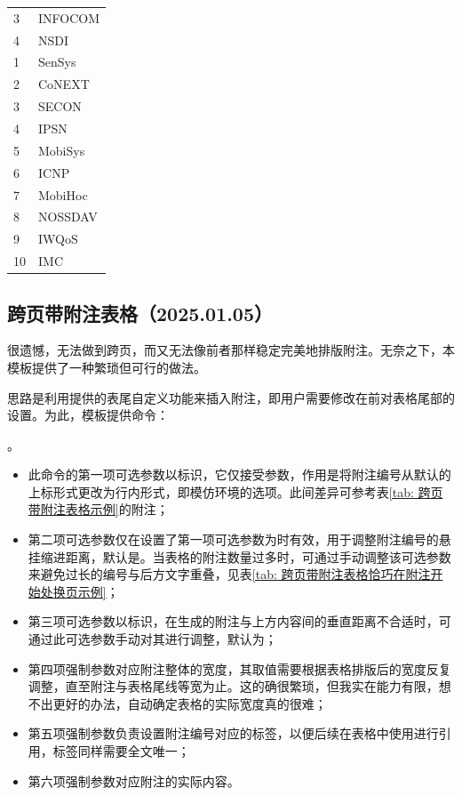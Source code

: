 \documentclass[doctor, vlined, ]{DissertUESTC}
\begin{document}
\begin{longtable}{p{2em} p{4.5em}}
		3 & INFOCOM \\
		4 & NSDI \\
		1 & SenSys \\
		2 & CoNEXT \\
		3 & SECON \\
		4 & IPSN \\
		5 & MobiSys \\
		6 & ICNP \\
		7 & MobiHoc \\
		8 & NOSSDAV \\
		9 & IWQoS \\
		10 & IMC \\
	\end{longtable}

	\clearpage
	\subsection{跨页带附注表格（2025.01.05）}

	很遗憾，无法做到跨页，而又无法像前者那样稳定完美地排版附注。无奈之下，本模板提供了一种繁琐但可行的做法。

	思路是利用提供的表尾自定义功能来插入附注，即用户需要修改在前对表格尾部的设置。为此，模板提供命令：
	
	。

	\begin{itemize}
		\item 此命令的第一项可选参数以\shad{()}标识，它仅接受参数，作用是将附注编号从默认的上标形式更改为行内形式，即模仿环境的选项。此间差异可参考表\ref{tab: 跨页带附注表格示例}的附注；
		\item 第二项可选参数仅在设置了第一项可选参数为时有效，用于调整附注编号的悬挂缩进距离，默认是\shad{1em}。当表格的附注数量过多时，可通过手动调整该可选参数来避免过长的编号与后方文字重叠，见表\ref{tab: 跨页带附注表格恰巧在附注开始处换页示例}；
		\item 第三项可选参数以\shad{[]}标识，在生成的附注与上方内容间的垂直距离不合适时，可通过此可选参数手动对其进行调整，默认为\shad{0bp}；
		\item 第四项强制参数对应附注整体的宽度，其取值需要根据表格排版后的宽度反复调整，直至附注与表格尾线等宽为止。这的确很繁琐，但我实在能力有限，想不出更好的办法，自动确定表格的实际宽度真的很难；
		\item 第五项强制参数负责设置附注编号对应的标签，以便后续在表格中使用进行引用，标签同样需要全文唯一；
		\item 第六项强制参数对应附注的实际内容。
	\end{itemize}
\end{document}
